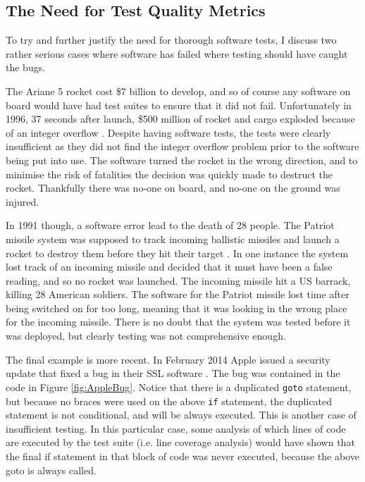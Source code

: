 \subsection{The Need for Test Quality Metrics}

To try and further justify the need for thorough software tests, I discuss two rather serious cases where software has failed where testing should have caught the bugs.

The Ariane 5 rocket cost \$7 billion to develop, and so of course any software on board would have had test suites to ensure that it did not fail. Unfortunately in 1996, 37 seconds after launch, \$500 million of rocket and cargo exploded because of an integer overflow \citep{ariane5}. Despite having software tests, the tests were clearly insufficient as they did not find the integer overflow problem prior to the software being put into use. The software turned the rocket in the wrong direction, and to minimise the risk of fatalities the decision was quickly made to destruct the rocket. Thankfully there was no-one on board, and no-one on the ground was injured.

In 1991 though, a software error lead to the death of 28 people. The Patriot missile system was supposed to track incoming ballistic missiles and launch a rocket to destroy them before they hit their target \citep{patriotMissile}. In one instance the system lost track of an incoming missile and decided that it must have been a false reading, and so no rocket was launched. The incoming missile hit a US barrack, killing 28 American soldiers. The software for the Patriot missile lost time after being switched on for too long, meaning that it was looking in the wrong place for the incoming missile. There is no doubt that the system was tested before it was deployed, but clearly testing was not comprehensive enough. 

The final example is more recent. In February 2014 Apple issued a security update that fixed a bug in their SSL software \cite{appleBug}. The bug was contained in the code in Figure \ref{fig:AppleBug}. Notice that there is a duplicated \verb|goto| statement, but because no braces were used on the above \verb|if| statement, the duplicated statement is not conditional, and will be always executed. This is another case of insufficient testing. In this particular case, some analysis of which lines of code are executed by the test suite (i.e. line coverage analysis) would have shown that the final if statement in that block of code was never executed, because the above goto is always called.

